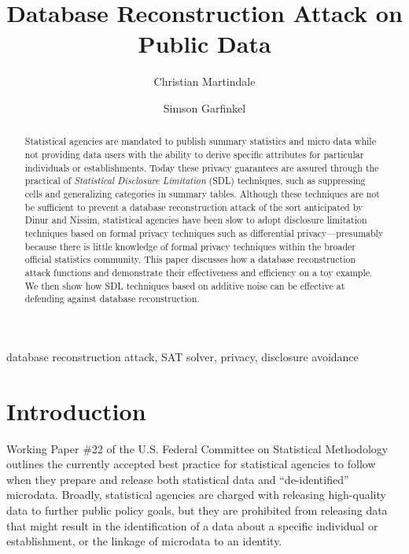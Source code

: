 \documentclass[runningheads]{llncs}
\newif\ifanonymized
\begin{document}
\title{Database Reconstruction Attack on Public Data}
\ifanonymized
\author{Anonymized Author(s)}
\institute{Institute for Anonymous Papers}
\else
\author{Christian Martindale \and Simson Garfinkel}
\fi

\maketitle
\begin{abstract}
Statistical agencies are mandated to publish summary statistics and
micro data while not providing data users with the ability to derive
specific attributes for particular individuals or
establishments. Today these privacy guarantees are assured through the
practical of \emph{Statistical Disclosure Limitation} (SDL)
techniques, such as suppressing cells and generalizing categories in
summary tables. Although these techniques are not be sufficient to
prevent a database reconstruction attack of the sort anticipated by
Dinur and Nissim\cite{noise}, statistical agencies have been slow to
adopt disclosure limitation techniques based on formal privacy
techniques such as differential privacy---presumably because there is
little knowledge of formal privacy techniques within the broader
official statistics community.  This paper discusses how a database
reconstruction attack functions and demonstrate their effectiveness
and efficiency on a toy example. We then show how SDL techniques based
on additive noise can be effective at defending against database
reconstruction.
\end{abstract}

\begin{keywords}
database reconstruction attack, SAT solver, privacy, disclosure avoidance
\end{keywords}


\section{Introduction}
Working Paper \#22 of the U.S. Federal Committee on Statistical
Methodology\cite{workingpaper22} outlines the currently accepted best
practice for statistical agencies to follow when they prepare and
release both statistical data and ``de-identified''
microdata. Broadly, statistical agencies are charged with releasing
high-quality data to further public policy goals, but they are
prohibited from releasing data that might result in the identification
of a data about a specific individual or establishment, or the linkage
of microdata to an identity.
\end{document}
